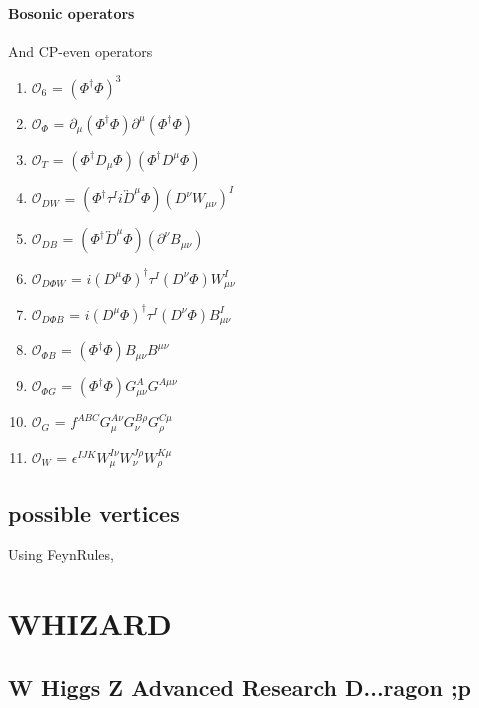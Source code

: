 \paragraph{Bosonic operators}
And CP-even operators
\begin{enumerate}
 \item $\mathcal{O}_6$ = $(\Phi^\dagger \Phi)^3$
 \item $\mathcal{O}_\Phi$ = $\partial_\mu (\Phi^\dagger \Phi) \partial^\mu (\Phi^\dagger \Phi)$
 \item $\mathcal{O}_T$ = $(\Phi^\dagger D_\mu \Phi) (\Phi^\dagger D^\mu \Phi)$
 \item $\mathcal{O}_{DW}$ = $(\Phi^\dagger \tau^I i \overleftrightarrow{D}^\mu \Phi) (D^\nu W_{\mu\nu})^I$
 \item $\mathcal{O}_{DB}$ = $(\Phi^\dagger \overleftrightarrow{D}^\mu \Phi) (\partial^\nu B_{\mu\nu})$
 \item $\mathcal{O}_{D \Phi W}$ = $i (D^\mu\Phi)^\dagger \tau^I (D^\nu \Phi)W_{\mu\nu}^I$
 \item $\mathcal{O}_{D \Phi B}$ = $i (D^\mu\Phi)^\dagger \tau^I (D^\nu \Phi)B_{\mu\nu}^I$
 \item $\mathcal{O}_{\Phi B}$ = $(\Phi^\dagger \Phi)B_{\mu\nu}B^{\mu\nu}$
 \item $\mathcal{O}_{\Phi G}$ = $(\Phi^\dagger \Phi)G^A_{\mu\nu}G^{A\mu\nu}$
 \item $\mathcal{O}_{G}$ = $f^{ABC} G^{A\nu}_{\mu} G^{B\rho}_{\nu} G^{C\mu}_{\rho}$
 \item $\mathcal{O}_{W}$ = $\epsilon^{IJK} W^{I\nu}_{\mu} W^{J\rho}_{\nu} W^{K\mu}_{\rho}$
\end{enumerate}



\subsection{possible vertices}
Using FeynRules, 


\section{WHIZARD}
\subsection*{W Higgs Z Advanced Research D...ragon ;p}
